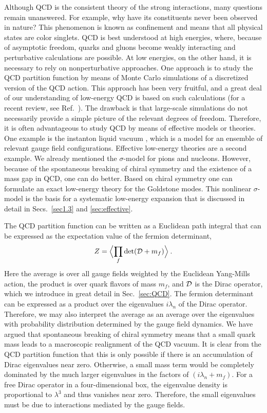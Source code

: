 Although QCD is the consistent theory of the strong interactions, many
questions remain unanswered. For example, why have its constituents
never been observed in nature? This phenomenon is known as confinement
and means that all physical states are color singlets.  QCD is best
understood at high energies, where, because of asymptotic freedom,
quarks and gluons become weakly interacting and perturbative
calculations are possible.  At low energies, on the other hand, it is
necessary to rely on nonperturbative approaches. One approach is to study
the QCD partition function by means of Monte Carlo simulations of a
discretized version of the QCD action. This approach has been very
fruitful, and a great deal of our understanding of low-energy QCD is
based on such calculations (for a recent review, see Ref.~\cite{detar}).
The drawback is that large-scale simulations do not necessarily
provide a simple picture of the relevant degrees of freedom.
Therefore, it is often advantageous to study QCD by means of
effective models or theories. One example is the instanton liquid
vacuum \cite{instantonl}, which is a model for an ensemble of relevant
gauge field configurations.  Effective low-energy theories are a
second example. We already mentioned the $\sigma$-model for pions and
nucleons. 
However, because of the spontaneous breaking of chiral symmetry and
the existence of a mass gap in QCD, one can do better. Based on chiral
symmetry one can formulate an exact low-energy theory for the
Goldstone modes. This nonlinear $\sigma$-model is the basis for a
systematic low-energy expansion \cite{Weinberg,GaL} that is
discussed in detail in Secs.~\ref{sec1.3} and \ref{sec:effective}.

The QCD partition function can be written as a Euclidean path integral
that can be expressed as the expectation value of the fermion
determinant,
\begin{equation}
  \label{eq1}
  Z = \Bigl\langle \prod_f \det ({\cal D}+m_f) \Bigr\rangle\:.
\end{equation}
Here the average is over all gauge fields weighted by the Euclidean
Yang-Mills action, the product is over quark flavors of mass $m_f$,
and ${\cal D}$ is the Dirac operator, which we introduce in great
detail in Sec.~\ref{sec:QCD}.  The fermion determinant can be
expressed as a product over the eigenvalues $i\lambda_n$ of the Dirac
operator.  Therefore, we may also interpret the average as an average
over the eigenvalues with probability distribution determined by the
gauge field dynamics.  We have argued that spontaneous breaking of
chiral symmetry means that a small quark mass leads to a macroscopic
realignment of the QCD vacuum.  It is clear from the QCD partition
function that this is only possible if there is an accumulation of
Dirac eigenvalues near zero. Otherwise, a small mass term would be
completely dominated by the much larger eigenvalues in the factors
of $(i\lambda_n+m_f)$.  For a free Dirac operator in a
four-dimensional box, the eigenvalue density is proportional to
$\lambda^3$ and thus vanishes near zero.  Therefore, the small
eigenvalues must be due to interactions mediated by the gauge
fields. 

